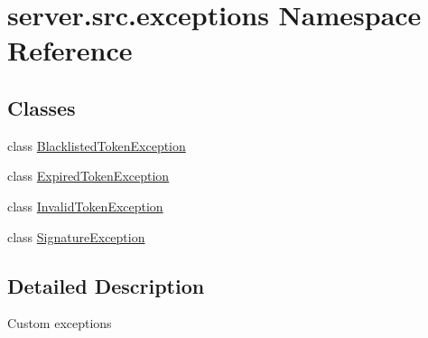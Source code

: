 \hypertarget{namespaceserver_1_1src_1_1exceptions}{}\section{server.\+src.\+exceptions Namespace Reference}
\label{namespaceserver_1_1src_1_1exceptions}
\subsection*{Classes}
\begin{DoxyCompactItemize}
\item 
class \hyperlink{classserver_1_1src_1_1exceptions_1_1_blacklisted_token_exception}{Blacklisted\+Token\+Exception}
\item 
class \hyperlink{classserver_1_1src_1_1exceptions_1_1_expired_token_exception}{Expired\+Token\+Exception}
\item 
class \hyperlink{classserver_1_1src_1_1exceptions_1_1_invalid_token_exception}{Invalid\+Token\+Exception}
\item 
class \hyperlink{classserver_1_1src_1_1exceptions_1_1_signature_exception}{Signature\+Exception}
\end{DoxyCompactItemize}


\subsection{Detailed Description}
\begin{DoxyVerb}Custom exceptions\end{DoxyVerb}
 